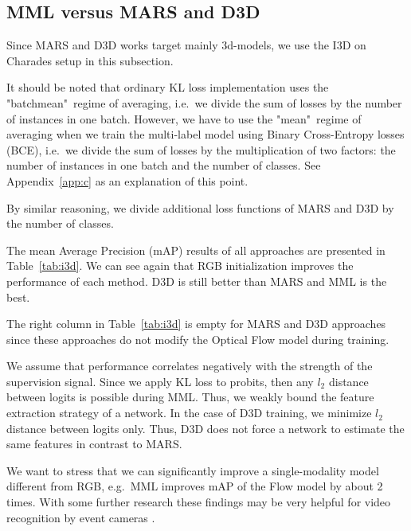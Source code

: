 \documentclass[conference]{IEEEtran}
\begin{document}
\subsection{MML versus MARS and D3D} \label{subsec:versus}

Since MARS \cite{Crasto_2019_CVPR} and D3D \cite{Stroud_2020_WACV} works target mainly 3d-models, we use the I3D on Charades setup in this subsection.

It should be noted that ordinary KL loss implementation uses the "batchmean"\ regime of averaging, i.e.~we divide the sum of losses by the number of instances in one batch. However, we have to use the "mean"\ regime of averaging when we train the multi-label model using Binary Cross-Entropy losses (BCE), i.e.~we divide the sum of losses by the multiplication of two factors: the number of instances in one batch and the number of classes. See Appendix~\ref{app:c} as an explanation of this point.

By similar reasoning, we divide additional loss functions of MARS and D3D by the number of classes.

The mean Average Precision (mAP) results of all approaches are presented in Table~\ref{tab:i3d}. We can see again that RGB initialization improves the performance of each method. D3D is still better than MARS and MML is the best.

The right column in Table~\ref{tab:i3d} is empty for MARS and D3D approaches since these approaches do not modify the Optical Flow model during training.

We assume that performance correlates negatively with the strength of the supervision signal. Since we apply KL loss to probits, then any $l_2$ distance between logits is possible during MML. Thus, we weakly bound the feature extraction strategy of a network. In the case of D3D training, we minimize $l_2$ distance between logits only. Thus, D3D does not force a network to estimate the same features in contrast to MARS.

We want to stress that we can significantly improve a single-modality model different from RGB, e.g.~MML improves mAP of the Flow model by about 2 times. With some further research these findings may be very helpful for video recognition by event cameras \cite{gehrig2020video}.
\end{document}
